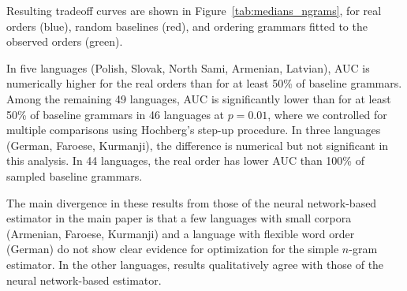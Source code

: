 \documentclass[11pt,letterpaper]{article}
\begin{document}
Resulting tradeoff curves are shown in Figure~\ref{tab:medians_ngrams}, for real orders (blue), random baselines (red), and ordering grammars fitted to the observed orders (green).

In five languages (Polish, Slovak, North Sami, Armenian, Latvian), AUC is numerically higher for the real orders than for at least 50\% of baseline grammars.
Among the remaining 49 languages, AUC is significantly lower than for at least 50\% of baseline grammars in 46 languages at $p=0.01$, where we controlled for multiple comparisons using Hochberg's step-up procedure.
In three languages (German, Faroese, Kurmanji), the difference is numerical but not significant in this analysis.
In 44 languages, the real order has lower AUC than 100\% of sampled baseline grammars.

The main divergence in these results from those of the neural network-based estimator in the main paper is that a few languages with small corpora (Armenian, Faroese, Kurmanji) and a language with flexible word order (German) do not show clear evidence for optimization for the simple $n$-gram estimator.
In the other languages, results qualitatively agree with those of the neural network-based estimator.


\begin{center}
\begin{longtable}{ccccccccccccccclll}




\end{longtable}
	\label{tab:medians_ngrams}
\end{center}
\end{document}
